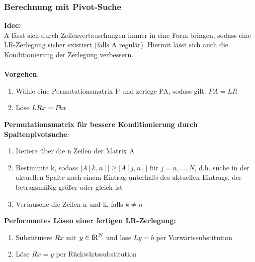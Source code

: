 \documentclass[10pt,a4paper]{article}
\def\realnumbers{{\rm I\!R}}
\begin{document}
	\subsubsection{Berechnung mit Pivot-Suche}
	\textbf{Idee:}\\A lässt sich durch Zeilenvertauschungen immer in eine Form bringen, sodass eine LR-Zerlegung sicher existiert (falls A regulär). Hiermit lässt sich auch die Konditionierung der Zerlegung verbessern.\\\\
	\textbf{Vorgehen}:
	\begin{enumerate}
		\item Wähle eine Permutationsmatrix P und zerlege PA, sodass gilt: $PA = LR$
		\item Löse $LRx = Pbx$
	\end{enumerate}
	\textbf{Permutationsmatrix für bessere Konditionierung durch Spaltenpivotsuche}:
	\begin{enumerate}
		\item Iteriere über die n Zeilen der Matrix A
		\item Bestimmte k, sodass $|A[k, n]| \geq |A[j, n]|$ für $j = n, ..., N$, d.h. suche in der aktuellen Spalte nach einem Eintrag unterhalb des aktuellen Eintrags, der betragsmäßig größer oder gleich ist
		\item Vertausche die Zeilen n und k, falls $k \neq n$
	\end{enumerate}
	\textbf{Performantes Lösen einer fertigen LR-Zerlegung:}
	\begin{enumerate}
		\item Substituiere $Rx$ mit $y\in\realnumbers^N$ und löse $Ly = b$ per Vorwärtssubstitution
		\item Löse $Rx = y$ per Rückwärtssubstitution
	\end{enumerate}
\end{document}
